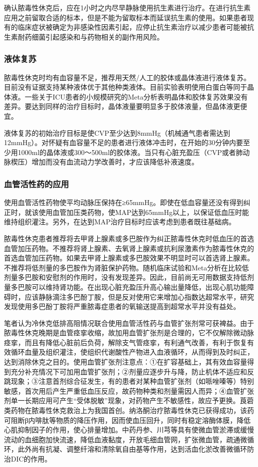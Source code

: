 确认脓毒性休克后，应在1小时之内尽早静脉使用抗生素进行治疗。在进行抗生素应用之前留取合适的标本，但是不能为留取标本而延误抗生素的使用。如果患者现有的临床症状被确定为非感染性因素引起，应停止抗生素治疗以减少患者可能被抗生素耐药细菌引起感染和与药物相关的副作用风险。

\subsubsection{液体复苏}

脓毒性休克时均有血容量不足，推荐用天然/人工的胶体或晶体液进行液体复苏。目前没有证据支持某种液体优于其他种类液体。目前实验表明使用白蛋白等同于晶体液。一些关于ICU患者的小规模研究的Meta分析表明晶体和胶体复苏效果没有差异。要达到同样的治疗目标时，晶体液量要明显多于胶体液量，但晶体液更便宜。

液体复苏的初始治疗目标是使CVP至少达到8mmHg（机械通气患者需达到12mmHg）。对怀疑有血容量不足的患者进行液体冲击时，在开始的30分钟内要至少用1000ml的晶体液或300～500ml的胶体液。当只有心脏充盈压（CVP或者肺动脉楔压）增加而没有血流动力学改善时，才应该降低补液速度。

\subsubsection{血管活性药的应用}

使用血管活性药物使平均动脉压保持在≥65mmHg。即使在低血容量还没有得到纠正时，就该使用血管加压类药物，使MAP达到65mmHg以上，以保证低血压时能维持组织灌注。另外，在达到MAP治疗目标时应该考虑到患者既往基础病。

脓毒性休克患者推荐将去甲肾上腺素或多巴胺作为纠正脓毒性休克时低血压的首选血管加压药物。不推荐将肾上腺素、去氧肾上腺素或抗利尿激素作为脓毒性休克的首选血管加压药物。如果去甲肾上腺素或多巴胺效果不明显时可以首选肾上腺素。不推荐将低剂量的多巴胺作为肾脏保护药物。随机临床试验和Meta分析在比较低剂量多巴胺和安慰剂的作用时，没有发现差异。因此，目前尚无可用数据支持低剂量多巴胺可以维持肾功能。在出现心脏充盈压升高心输出量降低，出现心肌功能障碍时，应该静脉滴注多巴酚丁胺，但是反对使用它来增加心指数达超常水平，研究发现使用多巴酚丁胺将严重脓毒症患者的氧输送提高到超常水平并没有益处。

笔者认为冷休克低排高阻情况联合使用血管活性药与血管扩张剂常可获裨益。由于脓毒性休克晚期是血管痉挛收缩，故加用血管扩张剂是合理的，它不仅解除微动脉痉挛，而且有降低心脏前后负荷，解除支气管痉挛，有利通气改善，有利于恢复有效循环血量及组织灌注，使组织代谢酸性产物进入血液循环，从而得到及时纠正，达到消除休克之目的。使用血管扩张剂注意点：①在扩容基础上，其有效血容量得到充分补充情况下可加用血管扩张剂；②剂量应逐步升与降，防止机体不适应和反跳现象；③注意首剂综合征发生，有的患者对某种血管扩张剂（如哌唑嗪等）特别敏感，首次用后产生严重低血压反应，故药物种类和剂量需因人而异；④血管扩张剂单一长期应用可产生“受体脱敏”现象，对药物产生不敏感性，故应予更换。莨菪类药物在脓毒性休克救治上为我国首创。纳洛酮治疗脓毒性休克已获得成功，该药可阻断β内啡肽等物质的降压作用，因而使血压回升，同时有稳定溶酶体膜，降低心肌抑制因子的作用，使心排量增加。中药丹参、川芎等具有使微血管淤滞或缓慢流动的血细胞加快流速，降低血液黏度，开放毛细血管网，扩张微血管，疏通微循环，此外尚有抗凝、调整纤溶和清除氧自由基等作用，达到活血化淤改善微循环防治DIC的作用。

